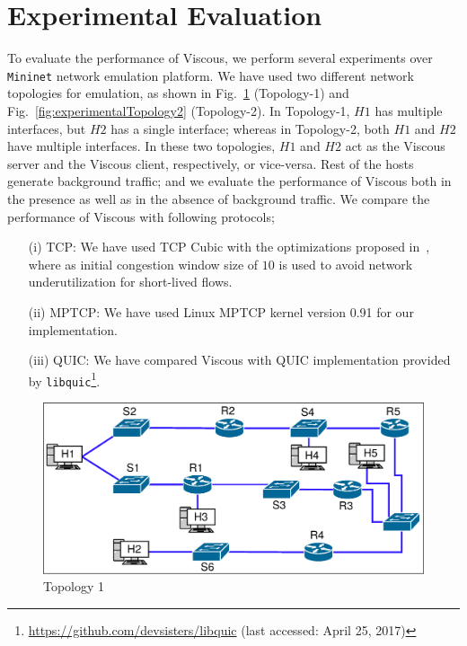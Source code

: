 \section{Experimental Evaluation}

To evaluate the performance of Viscous, we perform several experiments over \texttt{Mininet} network emulation platform. We have used two different network topologies for emulation, as shown in Fig.~\ref{fig:experimentalTopology1} (Topology-1) and Fig.~\ref{fig:experimentalTopology2} (Topology-2). In Topology-1, $H1$ has multiple interfaces, but $H2$ has a single interface; whereas in Topology-2, both $H1$ and $H2$ have multiple interfaces. In these two topologies, $H1$ and $H2$ act as the Viscous server and the Viscous client, respectively, or vice-versa. Rest of the hosts generate background traffic; and we evaluate the performance of Viscous both in the presence as well as in the absence of background traffic.  We compare the performance of Viscous with following protocols;
\begin{enumerate}
	\item[(i)] TCP: We have used TCP Cubic with the optimizations proposed in~\cite{largecwnd}, where as initial congestion window size of $10$ is used to avoid network underutilization for short-lived flows. 
	\item[(ii)] MPTCP: We have used Linux MPTCP kernel version 0.91 for our implementation.
	\item [(iii)] QUIC: We have compared Viscous with QUIC implementation provided by \texttt{libquic}\footnote{\url{https://github.com/devsisters/libquic} (last accessed: April 25, 2017)}. 
\end{enumerate}

\begin{figure}[!ht]
	\centering
	\includegraphics[width=\linewidth]{img/experimentalTopology1}
	\caption{Topology 1}
	\label{fig:experimentalTopology1}
\end{figure}

